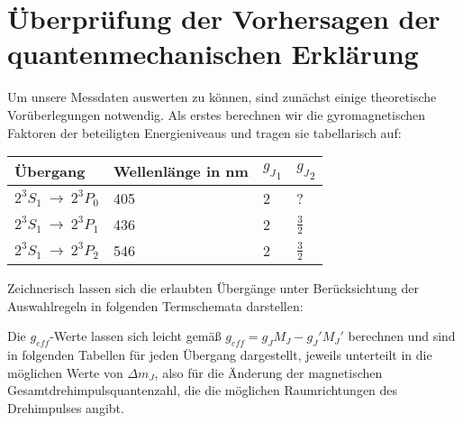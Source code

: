 \documentclass[bigchapter,colorback,accentcolor=tud4b,linedtoc,11pt]{tudreport}
\begin{document}
\section{Überprüfung der Vorhersagen der quantenmechanischen Erklärung}

Um unsere Messdaten auswerten zu können, sind zunächst einige theoretische Vorüberlegungen notwendig. Als erstes berechnen wir die gyromagnetischen Faktoren der beteiligten Energieniveaus und tragen sie tabellarisch auf: 

\begin{center}
  \begin{tabular}{|p{2.2cm}|p{4cm}|p{2cm}|p{2cm}|}
    \hline
    Übergang & Wellenlänge in nm & ${g_J}_1$ & ${g_J}_2$ \\ \hline
    $2^3S_1~\rightarrow~2^3P_0$ & 405 & 2 & ?  \\ \hline
    $2^3S_1~\rightarrow~2^3P_1$ & 436 & 2 & $\frac{3}{2}$ \\ \hline
    $2^3S_1~\rightarrow~2^3P_2$ & 546 & 2 & $\frac{3}{2}$ \\ \hline
	\end{tabular}
\end{center}

Zeichnerisch lassen sich die erlaubten Übergänge unter Berücksichtung der Auswahlregeln in folgenden Termschemata darstellen:

Die $g_{eff}$-Werte lassen sich leicht gemäß $g_{eff} = g_J M_J - g_J' M_J'$ berechnen und sind in folgenden Tabellen für jeden Übergang dargestellt, jeweils unterteilt in die möglichen Werte von $\Delta m_J$, also für die Änderung der magnetischen Gesamtdrehimpulsquantenzahl, die die möglichen Raumrichtungen des Drehimpulses angibt.
\end{document}
